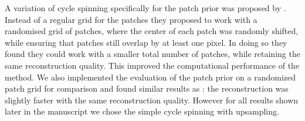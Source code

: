\documentclass[twocolumn]{aastex631}
\newcommand{\chandra}{\textit{Chandra}~}
\begin{document}
    A variation of cycle spinning specifically for the patch prior was proposed by \cite{Parameswaran2018}. Instead of a regular grid for the patches they proposed to work with a randomised grid of patches, where the center of each patch was randomly shifted, while ensuring that patches still overlap by at least one pixel. In doing so they found they could work with a smaller total number of patches, while retaining the same reconstruction quality. This improved the computational performance of the method. We also implemented the evaluation of the patch prior on a randomized patch grid for comparison and found similar results as \cite{Parameswaran2018}: the reconstruction was slightly faster with the same reconstruction quality. However for all results shown later in the manuscript we chose the simple cycle spinning with upsampling.






\end{document}
